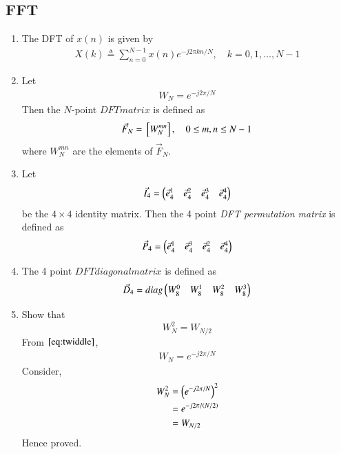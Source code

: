 \documentclass[journal,12pt,twocolumn]{IEEEtran}
\renewcommand\thesection{\arabic{section}}
\begin{document}
\begin{enumerate}[label=\thesection.\arabic*]
   \section{FFT}
   \begin{enumerate}[label=\arabic*.,ref=\thesection.\theenumi]
     \item The DFT of $x(n)$ is given by
     \begin{align}
       X(k) \triangleq \sum_{n=0}^{N-1} x(n) e^{-j 2 \pi k n / N}, \quad k=0,1, \ldots, N-1
     \end{align}
     \item Let 
     \begin{align}
       W_{N} = e^{-j2\pi/N} \label{eq:twiddle}
     \end{align}
     Then the $N$-point ${ DFT matrix}$ is defined as 
     \begin{align}
       \vec{F}_{N} = {}\left[W_{N}^{mn}\right], \quad 0 \le m,n \le N-1 \label{def:N-point_matrix} 
     \end{align}
     where $W_{N}^{mn}$ are the elements of $\vec{F}_{N}$.
     \item Let 
     \begin{align}
       \vec{I}_4 = \begin{pmatrix}\vec{e}_4^{1} &\vec{e}_4^{2} &\vec{e}_4^{3} &\vec{e}_4^{4} \end{pmatrix}
     \end{align}
     be the $4\times 4$ identity matrix.  Then the 4 point {\em DFT permutation matrix} is defined as 
     \begin{align}
       \vec{P}_4 = \begin{pmatrix}\vec{e}_4^{1} &\vec{e}_4^{3} &\vec{e}_4^{2} &\vec{e}_4^{4} \end{pmatrix} \label{elem_mat}
     \end{align}
     \item The 4 point ${ DFT diagonal matrix}$ is defined as 
     \begin{align}
       \vec{D}_4 = diag\begin{pmatrix}W_{8}^{0} & W_{8}^{1} & W_{8}^{2} & W_{8}^{3}\end{pmatrix}
     \end{align}
     \item Show that 
     \begin{equation}
       W_{N}^{2}=W_{N/2} \label{fft-3}
     \end{equation}
     \solution 
     From $\eqref{eq:twiddle}$,
     \begin{align}
       W_{N} = e^{-j2\pi/N}
     \end{align}
     Consider,
     \begin{align}
       W_{N}^{2} &= \left(e^{-j2\pi/N}\right)^2 \\
       &= e^{-j2\pi/\left(N/2\right)} \\
       &= W_{N/2}\label{result}
     \end{align}
     Hence proved.
     

\end{enumerate}
\end{enumerate}
\end{document}
